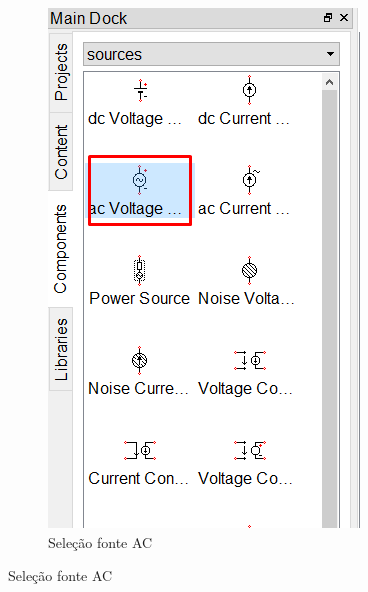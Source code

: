 \begin{figure}[H]
\begin{subfigure}{.4\textwidth}
        \includegraphics[width=.7\textwidth, trim={0 7cm 0 0}, clip]{imagens/CircuitoA/fonto_ac.png}
        \caption{Seleção fonte AC}
        \label{fig:sel_font_ac}
    \end{subfigure}    
    

\end{figure}
